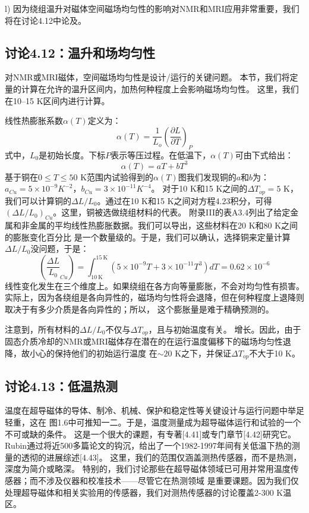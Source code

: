 l) 因为绕组温升对磁体空间磁场均匀性的影响对NMR和MRI应用非常重要，我们将在讨论4.12中论及。



\subsection{讨论4.12：温升和场均匀性}
对NMR或MRI磁体，空间磁场均匀性是设计/运行的关键问题。
本节，我们将定量的计算在允许的温升区间内，加热何种程度上会影响磁场均匀性。
这里，我们在10–15 K区间内进行计算。

线性热膨胀系数$\alpha(T)$定义为：
\begin{equation}%
\alpha(T)=\frac{1}{L_o}(\frac{\partial L}{\partial T})_P
\end{equation}
式中，$L_0$是初始长度。下标$P$表示等压过程。在低温下，$\alpha(T)$可由下式给出：
\begin{equation}%
\alpha(T)=aT+bT^3
\end{equation}
基于铜在$0\le T\le 50$ K范围内试验得到的$\alpha(T)$图我们发现铜的$a$和$b$为：
$a_{Cu}= 5\times 10^{-9} K^{−2}$，$b_{Cu} = 3\times 10^{−11} K^{−4}$。
对于10 K和15 K之间的$\Delta T_{op} = 5$ K，我们可以计算铜的$\Delta L/L_0$。通过在10 K和15 K之间对方程4.23积分，可得
$(\Delta L/L_0)_{Cu}$。这里，铜被选做绕组材料的代表。
附录III的表A3.4列出了给定金属和非金属的平均线性热膨胀数据。我们可以导出，这些材料在20 K和80 K之间的膨胀变化百分比
是一个数量级的。于是，我们可以确认，选择铜来定量计算$\Delta L/L_0$没问题，于是：
\begin{equation}%
(\frac{\Delta L}{L_0}_{Cu})=\int_{10\ \mathrm{K}}^{15\ \mathrm{K}}(5\times 10^{-9}T+3\times 10^{-11}T^3)dT=0.62\times 10^{-6}
\end{equation}
线性变化发生在三个维度上。如果绕组在各方向等量膨胀，不会对均匀性有损害。
实际上，因为各绕组是各向异性的，磁场均匀性将会退降，但在何种程度上退降则取决于有多少介质是各向异性的；所以，
这个膨胀量是难于精确预测的。

注意到，所有材料的$\Delta L/L_0$不仅与$\Delta T_{op}$，且与初始温度有关。
增长。因此，由于固态介质冷却的NMR或MRI磁体存在潜在的在运行温度偏移下的磁场均匀性退降，故小心的保持他们的初始运行温度
在$\sim 20$ K之下，并保证$\Delta T_{op}$不大于10 K。

\subsection{讨论4.13：低温热测}
温度在超导磁体的导体、制冷、机械、保护和稳定性等关键设计与运行问题中举足轻重，这在
图1.6中可推知一二。于是，温度测量成为超导磁体运行和试验的一个不可或缺的条件。
这是一个很大的课题，有专著[4.41]或专门章节[4.42]研究它。
Rubin通过将近500多篇论文的钩沉，给出了一个1982-1997年间有关低温下热的测量的透彻的进展综述[4.43]。
这里，我们的范围仅涵盖测热传感器，而不是热测，深度为简介或略深。
特别的，我们讨论那些在超导磁体领域已可用并常用温度传感器；而不涉及仪器和校准技术——尽管它在热测领域
是重要课题。因为我们仅处理超导磁体和相关实验用的传感器，我们对测热传感器的讨论覆盖2-300 K温区。

